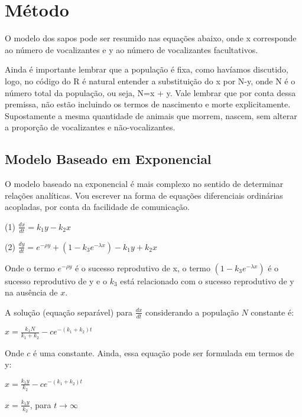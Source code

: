 \section{Método}\label{Metodo}
O modelo dos sapos pode ser resumido nas equações abaixo, onde x corresponde ao número de vocalizantes e y ao número de vocalizantes facultativos.

Ainda é importante lembrar que a população é fixa, como havíamos discutido, logo, no código do R é natural entender a substituição do x por N-y, onde N é o número total da população, ou seja, N=x + y. Vale lembrar que por conta dessa premissa, não estão incluindo os termos de nascimento e morte explicitamente. Supostamente a mesma quantidade de animais que morrem, nascem, sem alterar a proporção de vocalizantes e não-vocalizantes.

\subsection{Modelo Baseado em Exponencial}
O modelo baseado na exponencial é mais complexo no sentido de determinar relações analíticas. Vou escrever na forma de equações diferenciais ordinárias acopladas, por conta da facilidade de comunicação.

\vspace{3 mm}
(1) $\frac{dx}{dt} = k_1 y -k_2 x$

\vspace{3 mm}
(2) $\frac{dy}{dt}= e^{-\rho y} + (1-k_3 e^{-\lambda x}) -k_1 y +k_2 x$
\vspace{3 mm}

Onde o termo $e^{-\rho y}$ é o sucesso reprodutivo de x, o termo $(1-k_3 e^{-\lambda x})$ é o sucesso reprodutivo de y e o $k_3$ está relacionado com o sucesso reprodutivo de y na ausência de $x$.

A solução (equação separável) para $\frac{dx}{dt}$ considerando a população $N$ constante é:

\vspace{3 mm}
$x=\frac{k_1 N}{k_1 + k_2} - ce^{-(k_1 + k_2)t}$
\vspace{3 mm}

Onde $c$ é uma constante. Ainda, essa equação pode ser formulada em termos de y:

\vspace{3 mm}
$x=\frac{k_1 y}{k_2} - ce^{-(k_1 + k_2)t}$
\vspace{3 mm}

\vspace{3 mm}
$x=\frac{k_1 y}{k_2}$, para $t \rightarrow \infty$
\vspace{3 mm}

